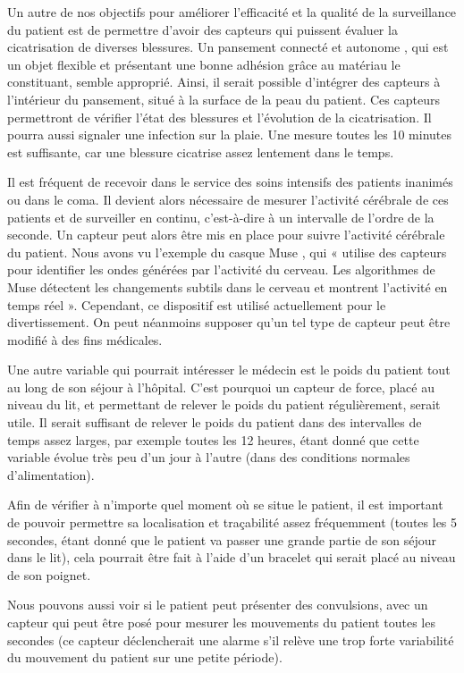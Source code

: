 \documentclass{article}
\begin{document}
Un autre de nos objectifs pour améliorer l’efficacité et la qualité de la surveillance du patient est de permettre d’avoir des capteurs qui puissent évaluer la cicatrisation de diverses blessures. Un pansement connecté et autonome \cite{Pansement}, qui est un objet flexible et présentant une bonne adhésion grâce au matériau le constituant, semble approprié. Ainsi, il serait possible d’intégrer des capteurs à l’intérieur du pansement, situé à la surface de la peau du patient. Ces capteurs permettront de vérifier l’état des blessures et l’évolution de la cicatrisation. Il pourra aussi signaler une infection sur la plaie. Une mesure toutes les 10 minutes est suffisante, car une blessure cicatrise assez lentement dans le temps.

Il est fréquent de recevoir dans le service des soins intensifs des patients inanimés ou dans le coma. Il devient alors nécessaire de mesurer l’activité cérébrale de ces patients et de surveiller en continu, c’est-à-dire à un intervalle de l'ordre de la seconde. Un capteur peut alors être mis en place pour suivre l’activité cérébrale du patient. Nous avons vu l’exemple du casque Muse \cite{Muse}, qui « utilise des capteurs pour identifier les ondes générées par l’activité du cerveau. Les algorithmes de Muse détectent les changements subtils dans le cerveau et montrent l’activité en temps réel ». Cependant, ce dispositif est utilisé actuellement pour le divertissement. On peut néanmoins supposer qu’un tel type de capteur peut  être modifié à des fins médicales.

Une autre variable qui pourrait intéresser le médecin est le poids du patient tout au long de son séjour à l’hôpital. C’est pourquoi un capteur de force, placé au niveau du lit, et permettant de relever le poids du patient régulièrement, serait utile. Il serait suffisant de relever le poids du patient dans des intervalles de temps assez larges, par exemple toutes les 12 heures, étant donné que cette variable évolue très peu d’un jour à l'autre (dans des conditions normales d'alimentation).

Afin de vérifier à n’importe quel moment où se situe le patient, il est important de pouvoir permettre sa localisation et traçabilité \cite{Localisation} assez fréquemment (toutes les 5 secondes, étant donné que le patient va passer une grande partie de son séjour dans le lit), cela pourrait être fait à l’aide d’un bracelet qui serait placé au niveau de son poignet. 

Nous pouvons aussi voir si le patient peut présenter des convulsions, avec un capteur \cite{Convulsion} qui peut être posé pour mesurer les mouvements du patient toutes les secondes (ce capteur déclencherait une alarme s’il relève une trop forte variabilité du mouvement du patient sur une petite période). 
\end{document}
